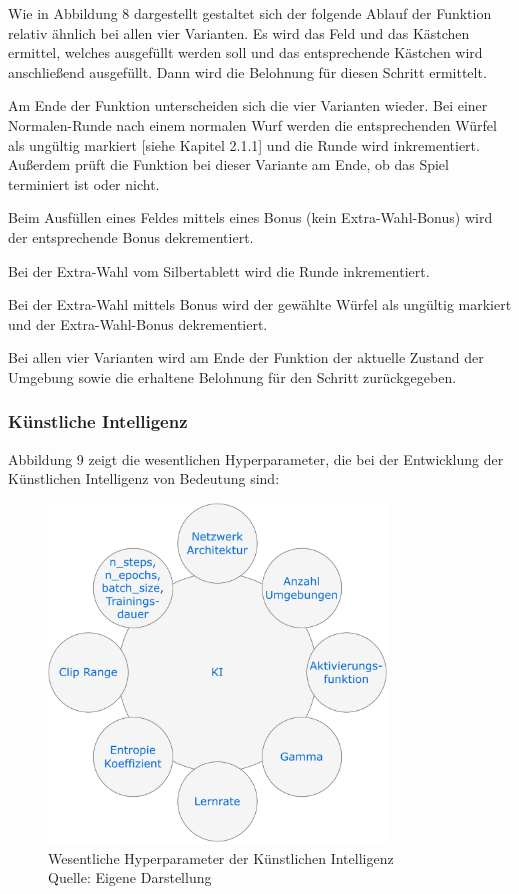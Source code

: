 Wie in Abbildung 8 dargestellt gestaltet sich der folgende Ablauf der Funktion relativ ähnlich bei allen vier Varianten. Es wird das Feld und das Kästchen ermittel, welches ausgefüllt werden soll und das entsprechende Kästchen wird anschließend ausgefüllt. Dann wird die Belohnung für diesen Schritt ermittelt.

Am Ende der Funktion unterscheiden sich die vier Varianten wieder. Bei einer Normalen-Runde nach einem normalen Wurf werden die entsprechenden Würfel als ungültig markiert [siehe Kapitel 2.1.1] und die Runde wird inkrementiert. Außerdem prüft die Funktion bei dieser Variante am Ende, ob das Spiel terminiert ist oder nicht.

Beim Ausfüllen eines Feldes mittels eines Bonus (kein Extra-Wahl-Bonus) wird der entsprechende Bonus dekrementiert.

Bei der Extra-Wahl vom Silbertablett wird die Runde inkrementiert.

Bei der Extra-Wahl mittels Bonus wird der gewählte Würfel als ungültig markiert und der Extra-Wahl-Bonus dekrementiert.

Bei allen vier Varianten wird am Ende der Funktion der aktuelle Zustand der Umgebung sowie die erhaltene Belohnung für den Schritt zurückgegeben.

\subsubsection{Künstliche Intelligenz}
Abbildung 9 zeigt die wesentlichen Hyperparameter, die bei der Entwicklung der Künstlichen Intelligenz von Bedeutung sind:
\nopagebreak
\begin{figure}[H]
	\includegraphics[width=0.8\textwidth]{Bilder/KI} 
	\caption[Wesentliche Hyperparameter der Künstlichen Intelligenz]{Wesentliche Hyperparameter der Künstlichen Intelligenz\\ Quelle: Eigene Darstellung}
\end{figure}

